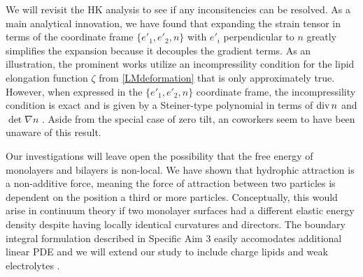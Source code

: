   We will revisit the HK analysis to see if any inconsitencies can be resolved.
  As a main analytical innovation, we have found that expanding the strain tensor in
  terms of the coordinate frame $\{e'_1, e'_2, n\}$ with $e'_i$ perpendicular to $n$
  greatly simplifies the expansion because it decouples the gradient terms. As an illustration, the prominent works
  \cite{10.1063/1.4990404, 10.1103/PhysRevE.102.042406, Hamm2000, https://doi.org/10.1039/C9SM02079A} utilize an
  incompressility condition for the lipid elongation function $\zeta$ from \eqref{LMdeformation} that is only approximately true. 
  However, when expressed in the $\{e'_1, e'_2, n\}$ coordinate frame, the incompressility condition is exact
  and is given by a Steiner-type polynomial in terms of $\operatorname{div} n$ and $\det \nabla n$ \cite{http://www.jstor.org/stable/1993504}.
  Aside from the special case of zero tilt, \cite{Hamm2000} an coworkers seem to have been unaware of this result.

Our investigations will leave open the possibility that the free energy of monolayers and bilayers is non-local. 
We have shown that hydrophic attraction is a non-additive force, meaning the force of attraction between two
particles is dependent on the position a third or more particles. Conceptually, this would arise in continuum theory if two monolayer surfaces
had a different elastic energy density despite having locally identical curvatures and directors.
The boundary integral formulation described in Specific Aim 3 easily accomodates additional linear PDE and
we will extend our study to include charge lipids and weak electrolytes \cite{DIMOVA}.

